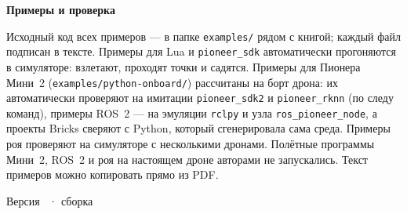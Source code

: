 {\bfseries\color{GeoskanDarkBlue} Примеры и проверка}\par
\vspace{4pt}
Исходный код всех примеров --- в папке \texttt{examples/} рядом с книгой; каждый файл подписан в тексте. Примеры для Lua и \texttt{pioneer\_sdk} автоматически прогоняются в симуляторе: взлетают, проходят точки и садятся. Примеры для Пионера Мини~2 (\texttt{examples/python-onboard/}) рассчитаны на борт дрона: их автоматически проверяют на имитации \texttt{pioneer\_sdk2} и \texttt{pioneer\_rknn} (по следу команд), примеры ROS~2 --- на эмуляции \texttt{rclpy} и узла \texttt{ros\_pioneer\_node}, а проекты Bricks сверяют с Python, который сгенерировала сама среда. Примеры роя проверяют на симуляторе с несколькими дронами. Полётные программы Мини~2, ROS~2 и роя на настоящем дроне авторами не запускались. Текст примеров можно копировать прямо из PDF.\par
\vspace{0.8cm}

{\footnotesize\color{GeoskanMuted} Версия \theversion\ · сборка \buildtimestamp\par}
\vspace*{\fill}
\clearpage
\pagestyle{scrheadings}
